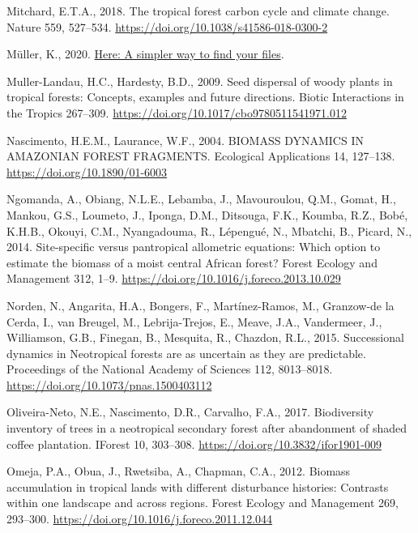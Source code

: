 \documentclass[
  12pt,
]{article}
\newlength{\cslhangindent}
\newlength{\cslentryspacingunit} %
\newenvironment{CSLReferences}[2] %
 {%
  \setlength{\parindent}{0pt}
  \ifodd #1
  \let\oldpar\par
  \def\par{\hangindent=\cslhangindent\oldpar}
  \fi
  \setlength{\parskip}{#2\cslentryspacingunit}
 }%
 {}
\begin{document}
\begin{CSLReferences}{1}{0}
\leavevmode{}%
Mitchard, E.T.A., 2018. The tropical forest carbon cycle and climate change. Nature 559, 527--534. \url{https://doi.org/10.1038/s41586-018-0300-2}

\leavevmode{}%
Müller, K., 2020. \href{https://CRAN.R-project.org/package=here}{Here: A simpler way to find your files}.

\leavevmode{}%
Muller-Landau, H.C., Hardesty, B.D., 2009. Seed dispersal of woody plants in tropical forests: Concepts, examples and future directions. Biotic Interactions in the Tropics 267--309. \url{https://doi.org/10.1017/cbo9780511541971.012}

\leavevmode{}%
Nascimento, H.E.M., Laurance, W.F., 2004. {BIOMASS DYNAMICS IN AMAZONIAN FOREST FRAGMENTS}. Ecological Applications 14, 127--138. \url{https://doi.org/10.1890/01-6003}

\leavevmode{}%
Ngomanda, A., Obiang, N.L.E., Lebamba, J., Mavouroulou, Q.M., Gomat, H., Mankou, G.S., Loumeto, J., Iponga, D.M., Ditsouga, F.K., Koumba, R.Z., Bobé, K.H.B., Okouyi, C.M., Nyangadouma, R., Lépengué, N., Mbatchi, B., Picard, N., 2014. Site-specific versus pantropical allometric equations: {Which} option to estimate the biomass of a moist central {African} forest? Forest Ecology and Management 312, 1--9. \url{https://doi.org/10.1016/j.foreco.2013.10.029}

\leavevmode{}%
Norden, N., Angarita, H.A., Bongers, F., Martínez-Ramos, M., Granzow-de la Cerda, I., van Breugel, M., Lebrija-Trejos, E., Meave, J.A., Vandermeer, J., Williamson, G.B., Finegan, B., Mesquita, R., Chazdon, R.L., 2015. Successional dynamics in {Neotropical} forests are as uncertain as they are predictable. Proceedings of the National Academy of Sciences 112, 8013--8018. \url{https://doi.org/10.1073/pnas.1500403112}

\leavevmode{}%
Oliveira-Neto, N.E., Nascimento, D.R., Carvalho, F.A., 2017. Biodiversity inventory of trees in a neotropical secondary forest after abandonment of shaded coffee plantation. IForest 10, 303--308. \url{https://doi.org/10.3832/ifor1901-009}

\leavevmode{}%
Omeja, P.A., Obua, J., Rwetsiba, A., Chapman, C.A., 2012. Biomass accumulation in tropical lands with different disturbance histories: {Contrasts} within one landscape and across regions. Forest Ecology and Management 269, 293--300. \url{https://doi.org/10.1016/j.foreco.2011.12.044}


\end{CSLReferences}
\end{document}

